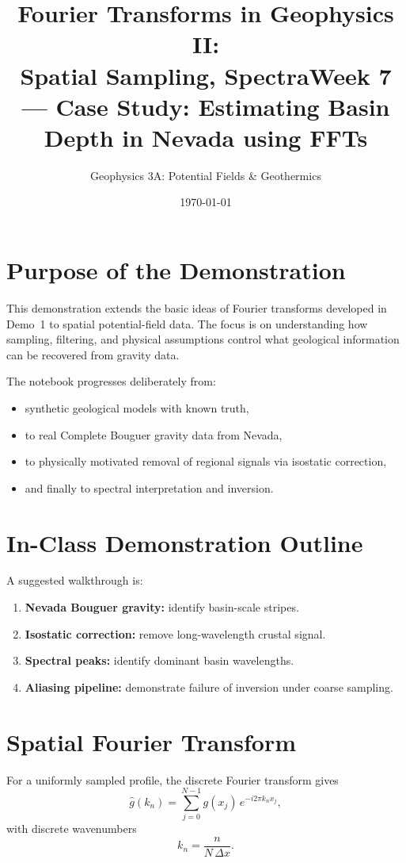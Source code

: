 \documentclass[11pt,a4paper]{article}
\title{Fourier Transforms in Geophysics II:\\
Spatial Sampling, Spectra}
\title{Week 7 --- Case Study: Estimating Basin Depth in Nevada using FFTs}
\author{Geophysics 3A: Potential Fields \& Geothermics}
\date{\today}
\begin{document}
\maketitle

\section{Purpose of the Demonstration}

This demonstration extends the basic ideas of Fourier transforms developed in Demo~1 to spatial potential-field data.  The focus is on understanding how sampling, filtering, and physical assumptions control what geological information can be recovered from gravity data.

The notebook progresses deliberately from:
\begin{itemize}
  \item synthetic geological models with known truth,
  \item to real Complete Bouguer gravity data from Nevada,
  \item to physically motivated removal of regional signals via isostatic correction,
  \item and finally to spectral interpretation and inversion.
\end{itemize}

\section{In-Class Demonstration Outline}

A suggested walkthrough is:

\begin{enumerate}
  \item \textbf{Nevada Bouguer gravity:} identify basin-scale stripes.
  \item \textbf{Isostatic correction:} remove long-wavelength crustal signal.
  \item \textbf{Spectral peaks:} identify dominant basin wavelengths.
  \item \textbf{Aliasing pipeline:} demonstrate failure of inversion under coarse sampling.
\end{enumerate}


\section{Spatial Fourier Transform}

For a uniformly sampled profile, the discrete Fourier transform gives
\begin{equation}
\hat{g}(k_n) = \sum_{j=0}^{N-1} g(x_j)\, e^{-i 2\pi k_n x_j},
\end{equation}
with discrete wavenumbers
\begin{equation}
k_n = \frac{n}{N\,\Delta x}.
\end{equation}
\end{document}
